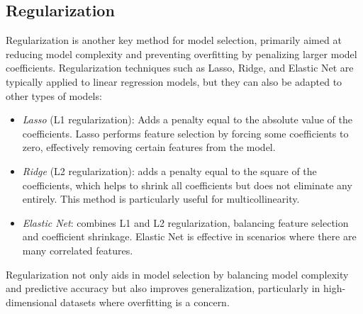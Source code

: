 \subsection{Regularization}
Regularization is another key method for model selection, primarily aimed at reducing model complexity and preventing overfitting by penalizing larger model coefficients. 
Regularization techniques such as Lasso, Ridge, and Elastic Net are typically applied to linear regression models, but they can also be adapted to other types of models: 
\begin{itemize} 
    \item \textit{Lasso} (L1 regularization): Adds a penalty equal to the absolute value of the coefficients. 
        Lasso performs feature selection by forcing some coefficients to zero, effectively removing certain features from the model. 
    \item \textit{Ridge} (L2 regularization): adds a penalty equal to the square of the coefficients, which helps to shrink all coefficients but does not eliminate any entirely. 
        This method is particularly useful for multicollinearity. 
    \item \textit{Elastic Net}: combines L1 and L2 regularization, balancing feature selection and coefficient shrinkage. 
        Elastic Net is effective in scenarios where there are many correlated features. 
\end{itemize}
Regularization not only aids in model selection by balancing model complexity and predictive accuracy but also improves generalization, particularly in high-dimensional datasets where overfitting is a concern.